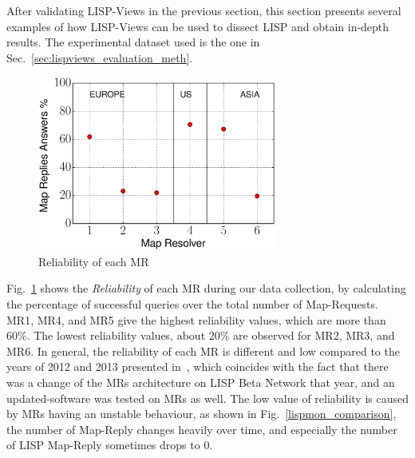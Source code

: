 After validating LISP-Views in the previous section, this section presents several examples of how LISP-Views can be used to dissect LISP and obtain in-depth results. The experimental dataset used is the one in Sec.~\ref{sec:lispviews_evaluation_meth}.

\begin{figure}[!t]
        \centering
        \includegraphics[width=0.7\textwidth]{Pics/Reliability.eps}
        \caption{Reliability of each MR}
        \label{MRs_reliability}
\end{figure}
Fig.~\ref{MRs_reliability} shows the \emph{Reliability} of each MR during our
data collection, by calculating the percentage of successful queries over the
total number of Map-Requests. MR1, MR4, and MR5 give the highest
reliability values, which are more than 60\%. The lowest reliability values,
about 20\% are observed for MR2, MR3, and MR6. In general, the
reliability of each MR is different and low compared to the years of 2012 and
2013 presented in~\cite{coras2014performance}, which coincides with the fact
that there was a change of the MRs architecture on LISP Beta Network that year,
and an updated-software was tested on MRs as well.  The low value of
reliability is caused by MRs having an unstable behaviour, as shown in
Fig.~\ref{lispmon_comparison}, the number of Map-Reply changes heavily over
time, and especially the number of LISP Map-Reply sometimes drops to 0.

